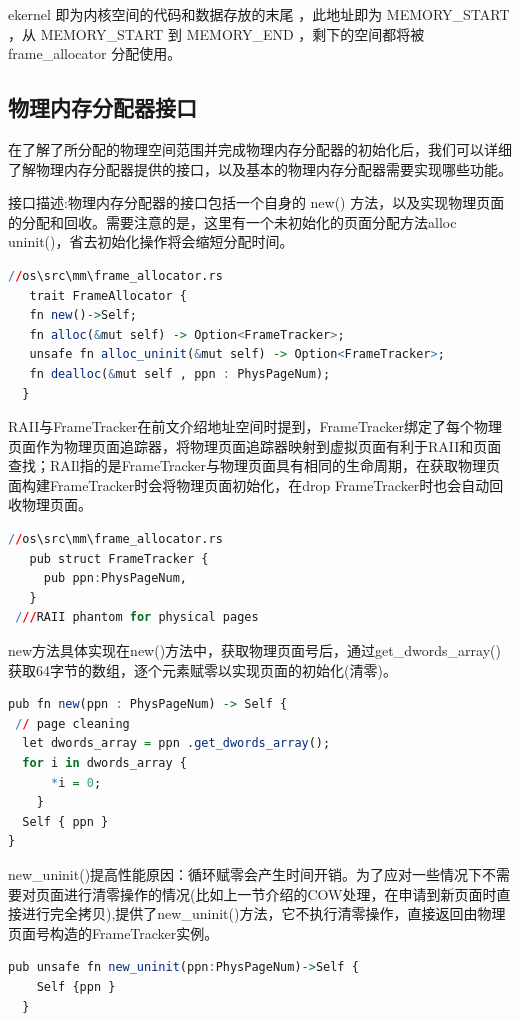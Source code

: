 \documentclass[12pt, a4paper]{ctexart}
\begin{document}
	ekernel 即为内核空间的代码和数据存放的末尾 ，此地址即为 MEMORY\_START ，从 MEMORY\_START 到 MEMORY\_END ，剩下的空间都将被 frame\_allocator 分配使用。
	
	\subsection{物理内存分配器接口}
	在了解了所分配的物理空间范围并完成物理内存分配器的初始化后，我们可以详细了解物理内存分配器提供的接口，以及基本的物理内存分配器需要实现哪些功能。
	
	接口描述:物理内存分配器的接口包括一个自身的 new() 方法，以及实现物理页面的分配和回收。需要注意的是，这里有一个未初始化的页面分配方法alloc uninit()，省去初始化操作将会缩短分配时间。
\begin{lstlisting}[language=R]
 //os\src\mm\frame_allocator.rs
   trait FrameAllocator {
   fn new()->Self;
   fn alloc(&mut self) -> Option<FrameTracker>;
   unsafe fn alloc_uninit(&mut self) -> Option<FrameTracker>;
   fn dealloc(&mut self , ppn : PhysPageNum);
  }
\end{lstlisting}
    
    RAII与FrameTracker在前文介绍地址空间时提到，FrameTracker绑定了每个物理页面作为物理页面追踪器，将物理页面追踪器映射到虚拟页面有利于RAII和页面查找；RAIl指的是FrameTracker与物理页面具有相同的生命周期，在获取物理页面构建FrameTracker时会将物理页面初始化，在drop FrameTracker时也会自动回收物理页面。
    
    \begin{lstlisting}[language=R]
 //os\src\mm\frame_allocator.rs
   pub struct FrameTracker {
     pub ppn:PhysPageNum,
   }
 ///RAII phantom for physical pages
    \end{lstlisting}

    new方法具体实现在new()方法中，获取物理页面号后，通过get\_dwords\_array()获取64字节的数组，逐个元素赋零以实现页面的初始化(清零)。
\begin{lstlisting}[language=R]
 pub fn new(ppn : PhysPageNum) -> Self {
 // page cleaning
  let dwords_array = ppn .get_dwords_array();
  for i in dwords_array {
	  *i = 0;
	}
  Self { ppn }
}
\end{lstlisting}
    
    new\_uninit()提高性能原因：循环赋零会产生时间开销。为了应对一些情况下不需要对页面进行清零操作的情况(比如上一节介绍的COW处理，在申请到新页面时直接进行完全拷贝),提供了new\_uninit()方法，它不执行清零操作，直接返回由物理页面号构造的FrameTracker实例。
    \begin{lstlisting}[language=R]
 pub unsafe fn new_uninit(ppn:PhysPageNum)->Self {
    Self {ppn }
  }
    \end{lstlisting}
\end{document}
